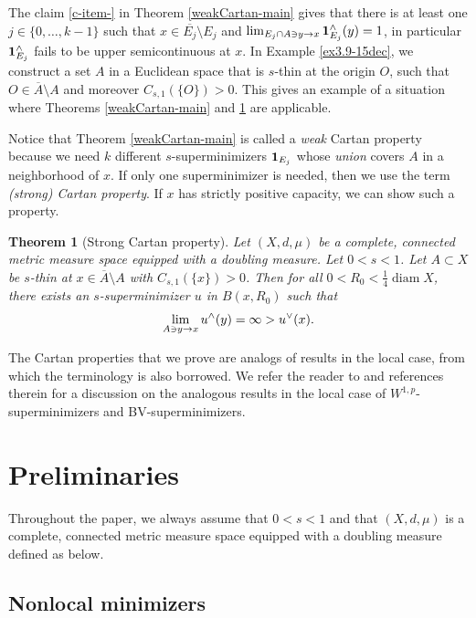 \documentclass[11pt,leqno]{amsart}
\newtheorem{theorem}{Theorem}[section]
\numberwithin{equation}{section}
\theoremstyle{definition}
\DeclareMathOperator{\diam}{diam}
\begin{document}
	The claim \ref{c-item-} in Theorem \ref{weakCartan-main} gives that there is at least one $j\in\{0,\ldots,k-1\}$ such that $x\in \overline {E_j}\setminus E_j$ and $\lim_{E_j\cap A\ni y\to x}{\bf 1}_{E_j}^\wedge(y)=1$,
	{in particular ${\bf 1}_{E_j}^\wedge$ fails to be upper semicontinuous at $x$}.
	In Example \ref{ex3.9-15dec}, we construct a set $A$
	in a Euclidean space that is $s$-thin at the origin $O$,
	such that  $O\in\overline{A}\setminus A$ and moreover $C_{s,1}(\{O\})>0$.
	This gives an example of a situation where Theorems \ref{weakCartan-main}
	and \ref{thm3.17-26nov} are applicable.
	
	Notice that Theorem \ref{weakCartan-main} is called a \emph{weak} Cartan property
	because we need $k$ different $s$-superminimizers ${\bf 1}_{E_j}$ whose
	\emph{union} covers $A$ in a neighborhood of $x$.
	If only one superminimizer is needed, then we use the term \emph{(strong) Cartan property}.
	If $x$ has strictly positive capacity, we can show such a property.
	
	\begin{theorem}
		[Strong Cartan property]
		\label{thm3.17-26nov}
		Let $(X,d,\mu)$ be a complete, connected metric measure space equipped with a doubling measure.  Let $0<s<1$. 
		Let $A\subset X$ be  
		{$s$-thin}
		at $x\in \overline A\setminus A$ with $C_{s,1}(\{x\})>0$. 
		Then for all $0<R_0<\frac{1}{4}\diam X$, there exists
		an $s$-superminimizer $u$ 
		{in $B(x,R_0)$}
		such that 
		\begin{equation}\notag
			\lim_{A\ni y\to x}u^\wedge (y)=\infty>u^\vee(x).
		\end{equation}
	\end{theorem}
	
	
	The Cartan properties that we prove
	are analogs of results in the local case, from which the terminology is also borrowed.
	We refer the reader to \cite{BBL15,BBL18,La20,MZ} and references therein for
	a discussion on the analogous results
	in the local case of $W^{1,p}$-superminimizers and  BV-superminimizers.
	
	
	
	\section{Preliminaries}
	Throughout the paper,   we always assume that $0<s<1$  and 
	that $(X,d,\mu)$ is a complete, connected metric measure space equipped with a doubling measure defined as below.
	\subsection{Nonlocal minimizers}\ \label{sec2.1}
	
\end{document}
